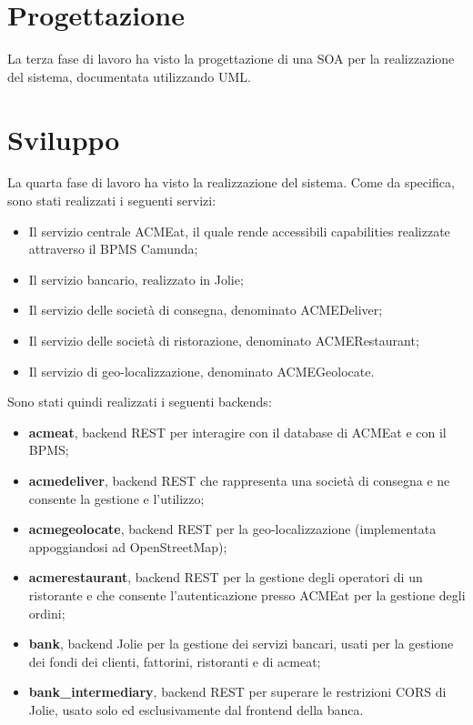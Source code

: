 \documentclass[11pt]{article} %
\begin{document}
\clearpage

\section{Progettazione}
\label{sez:progettazione}

La terza fase di lavoro ha visto la progettazione di una SOA per la realizzazione del sistema, documentata utilizzando UML.

\clearpage

\section{Sviluppo}
\label{sez:sviluppo}

La quarta fase di lavoro ha visto la realizzazione del sistema. Come da specifica, sono stati realizzati i seguenti servizi:
\begin{itemize}
\item Il servizio centrale ACMEat, il quale rende accessibili capabilities realizzate attraverso il BPMS Camunda;
\item Il servizio bancario, realizzato in Jolie;
\item Il servizio delle società di consegna, denominato ACMEDeliver;
\item Il servizio delle società di ristorazione, denominato ACMERestaurant;
\item Il servizio di geo-localizzazione, denominato ACMEGeolocate.
\end{itemize}
Sono stati quindi realizzati i seguenti backends:
\begin{itemize}
\item \textbf{acmeat}, backend REST per interagire con il database di ACMEat e con il BPMS;
\item \textbf{acmedeliver}, backend REST che rappresenta una società di consegna e ne consente la gestione e l'utilizzo;
\item \textbf{acmegeolocate}, backend REST per la geo-localizzazione (implementata appoggiandosi ad OpenStreetMap);
\item \textbf{acmerestaurant}, backend REST per la gestione degli operatori di un ristorante e che consente l'autenticazione presso ACMEat per la gestione degli ordini;
\item \textbf{bank}, backend Jolie per la gestione dei servizi bancari, usati per la gestione dei fondi dei clienti, fattorini, ristoranti e di acmeat;
\item \textbf{bank\_intermediary}, backend REST per superare le restrizioni CORS di Jolie, usato solo ed esclusivamente dal frontend della banca.
\end{itemize}
\end{document}
